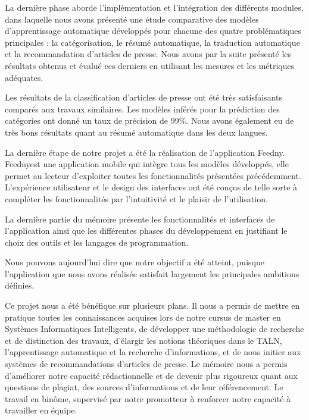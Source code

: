 La dernière phase aborde l'implémentation et l'intégration des différents modules, dans laquelle nous avons présenté une étude comparative des modèles d'apprentissage automatique développés pour chacune des quatre problématiques principales : la catégorisation, le résumé automatique, la traduction automatique et la recommandation d'articles de presse. Nous avons par la suite présenté les résultats obtenus et évalué ces derniers en utilisant les mesures et les métriques adéquates.
 
Les résultats de la classification d'articles de presse ont été très satisfaisants comparés aux travaux similaires. Les modèles inférés pour la prédiction des catégories ont donné un taux de précision de 99\%. Nous avons également eu de très bons résultats quant au résumé automatique dans les deux langues.
 
La dernière étape de notre projet a été la réalisation de l'application \textquotedbl Feedny\textquotedbl.\\
\textquotedbl Feedny\textquotedbl est une application mobile qui intègre tous les modèles développés, elle permet au lecteur d'exploiter toutes les fonctionnalités présentées précédemment. L'expérience utilisateur et le design des interfaces ont été conçus de telle sorte à compléter les fonctionnalités par l'intuitivité et le plaisir de l'utilisation.
 
La dernière partie du mémoire présente les fonctionnalités et interfaces de l'application ainsi que les différentes phases du développement en justifiant le choix des outils et les langages de programmation.
 
Nous pouvons aujourd’hui dire que notre objectif a été atteint, puisque l’application que nous avons réalisée satisfait largement les principales ambitions définies.
 
Ce projet nous a été bénéfique sur plusieurs plans. Il nous a permis de mettre en pratique toutes les connaissances acquises lors de notre cursus de master en Systèmes Informatiques Intelligents, de développer une méthodologie de recherche et de distinction des travaux, d'élargir les notions théoriques dans le TALN, l'apprentissage automatique et la recherche d'informations, et de nous initier aux systèmes de recommandations d'articles de presse. Le mémoire nous a permis d'améliorer notre capacité rédactionnelle et de devenir plus rigoureux quant aux questions de plagiat, des sources d'informations et de leur référencement. Le travail en binôme, supervisé par notre promotteur à renforcer notre capacité à travailler en équipe.
 
